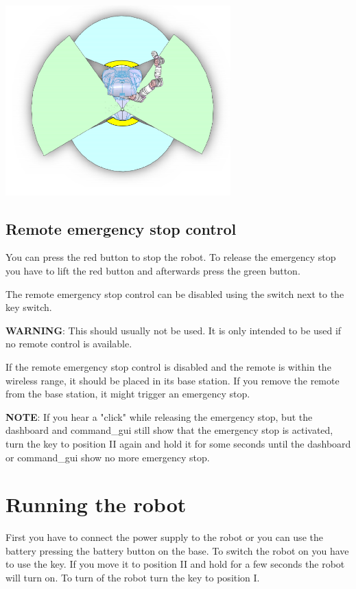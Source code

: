 \begin{center}
\includegraphics[width=0.65\textwidth]{images/protection_areas.png}
\end{center}

\subsection{Remote emergency stop control}
You can press the red button to stop the robot. To release the emergency stop you have to lift the red button and afterwards press the green button.

The remote emergency stop control can be disabled using the switch next to the key switch.

\textbf{WARNING}: This should usually not be used. It is only intended to be used if no remote control is available.

If the remote emergency stop control is disabled and the remote is within the wireless range, it should be placed in its base station. If you remove the remote from the base station, it might trigger an emergency stop.

\textbf{NOTE}: If you hear a "click" while releasing the emergency stop, but the dashboard and command\_gui still show that the emergency stop is activated, turn the key to position II again and hold it for some seconds until the dashboard or command\_gui show no more emergency stop.


\section{Running the robot}
First you have to connect the power supply to the robot or you can use the battery pressing the battery button on the base. To switch the robot on you have to use the key. If you move it to position II and hold for a few seconds the robot will turn on. To turn of the robot turn the key to position I. 

